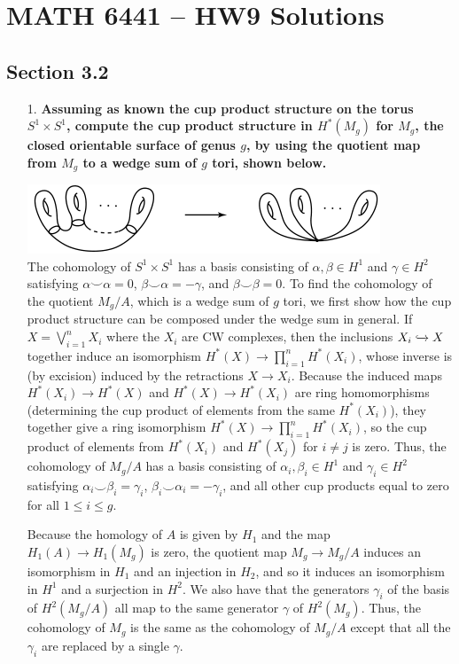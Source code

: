 \documentclass[12pt]{article}
\newcommand{\inc}{\xhookrightarrow{}}
\begin{document}
\section*{MATH 6441 -- HW9 Solutions}
\subsection*{Section 3.2}
\begin{enumerate}
    \item[1.]
        \boldmath\textbf{Assuming as known the cup product structure on the torus $S^1 \times S^1$, compute the cup product structure in $H^*(M_g)$ for $M_g$, the closed orientable surface of genus $g$, by using the quotient map from $M_g$ to a wedge sum of $g$ tori, shown below.
        }\unboldmath \par
        {\centering
            \includegraphics[scale=1]{Mg_quotient}
        \\}
        The cohomology of $S^1 \times S^1$ has a basis consisting of $\alpha, \beta \in H^1$ and $\gamma \in H^2$ satisfying $\alpha \smile \alpha = 0$, $\beta \smile \alpha = -\gamma$, and $\beta \smile \beta = 0$. To find the cohomology of the quotient $M_g / A$, which is a wedge sum of $g$ tori, we first show how the cup product structure can be composed under the wedge sum in general. If $X = \bigvee_{i = 1}^n X_i$ where the $X_i$ are CW complexes, then the inclusions $X_i \inc X$ together induce an isomorphism $H^*(X) \to \prod_{i = 1}^n H^*(X_i)$, whose inverse is (by excision) induced by the retractions $X \to X_i$. Because the induced maps $H^*(X_i) \to H^*(X)$ and $H^*(X) \to H^*(X_i)$ are ring homomorphisms (determining the cup product of elements from the same $H^*(X_i)$), they together give a ring isomorphism $H^*(X) \to \prod_{i = 1}^n H^*(X_i)$, so the cup product of elements from $H^*(X_i)$ and $H^*(X_j)$ for $i \neq j$ is zero. Thus, the cohomology of $M_g/A$ has a basis consisting of $\alpha_i, \beta_i \in H^1$ and $\gamma_i \in H^2$ satisfying $\alpha_i \smile \beta_i = \gamma_i$, $\beta_i \smile \alpha_i = -\gamma_i$, and all other cup products equal to zero for all $1 \leq i \leq g$. \par
        Because the homology of $A$ is given by $H_1$ and the map $H_1(A) \to H_1(M_g)$ is zero, the quotient map $M_g \to M_g/A$ induces an isomorphism in $H_1$ and an injection in $H_2$, and so it induces an isomorphism in $H^1$ and a surjection in $H^2$. We also have that the generators $\gamma_i$ of the basis of $H^2(M_g/A)$ all map to the same generator $\gamma$ of $H^2(M_g)$. Thus, the cohomology of $M_g$ is the same as the cohomology of $M_g/A$ except that all the $\gamma_i$ are replaced by a single $\gamma$.


\end{enumerate}
\end{document}
